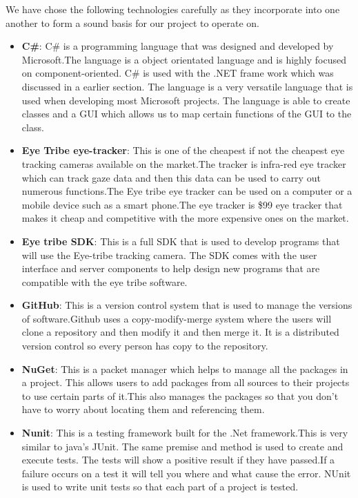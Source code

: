 We have chose the following technologies carefully as they incorporate into one another to form a sound basis for our project to operate on.

\begin{itemize}
	\item \textbf{C\#}:	C\# is a programming language that was designed and developed by Microsoft.The language is a object orientated language and is highly focused on component-oriented. C\# is used with the .NET frame work which was discussed in a earlier section. The language is a very versatile language that is used when developing most Microsoft projects. The language is able to create classes and a GUI which allows us to map certain functions of the GUI to the class.
	
	\item \textbf{Eye Tribe eye-tracker}: This is one of the cheapest if not the cheapest eye tracking cameras available on the market.The tracker is infra-red eye tracker which can track gaze data and then this data can be used to carry out numerous functions.The Eye tribe eye tracker can be used on a computer or a mobile device such as a smart phone.The eye tracker is \$99 eye tracker that makes it cheap and competitive with the more expensive ones on the market.
	
	\item \textbf{Eye tribe SDK}: This is a full SDK that is used to develop programs that will use the Eye-tribe tracking camera. The SDK comes with the user interface and server components to help design new programs that are compatible with the eye tribe software.
	
	\item \textbf{GitHub}: This is a version control system that is used to manage the versions of software.Github uses a copy-modify-merge system where the users will clone a repository and then modify it and then merge it. It is a distributed version control so every person has copy to the repository.
		\item \textbf{NuGet}: This is a packet manager which helps to manage all the packages in a project. This allows users to add packages from all sources to their projects to use certain parts of it.This also manages the packages so that you don't have to worry about locating them and referencing them.
		\item \textbf{Nunit}: This is a testing framework built for the .Net framework.This is very similar to java's JUnit. The same premise and method is used to create and execute tests. The tests will show a positive result if they have passed.If a failure occurs on a test it will tell you where and what cause the error. NUnit is used to write unit tests so that each part of a project is tested.
		

\end{itemize}
